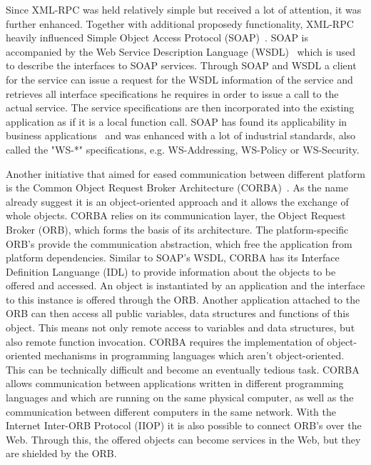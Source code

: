 Since \textrm{XML-RPC} was held relatively simple but received a lot of attention, it was further enhanced.
Together with additional proposedy functionality, XML-RPC heavily influenced Simple Object Access Protocol (\textrm{SOAP})~\cite{box2000simple}.
\textrm{SOAP} is accompanied by the Web Service Description Language (\textrm{WSDL})~\cite{christensen2001web} which is used to describe the interfaces to SOAP services.
Through \textrm{SOAP} and \textrm{WSDL} a client for the service can issue a request for the \textrm{WSDL} information of the service and retrieves all interface specifications he requires in order to issue a call to the actual service.
The service specifications are then incorporated into the existing application as if it is a local function call.
\textrm{SOAP} has found its applicability in business applications~\cite{journals/itpro/BarrosD06} and was enhanced with a lot of industrial standards, also called the "WS-*" specifications, e.g. WS-Addressing, WS-Policy or WS-Security.

Another initiative that aimed for eased communication between different platform is the Common Object Request Broker Architecture (\textrm{CORBA})~\cite{dec1991common}.
As the name already suggest it is an object-oriented approach and it allows the exchange of whole objects.
\textrm{CORBA} relies on its communication layer, the Object Request Broker (\textrm{ORB}), which forms the basis of its architecture.
The platform-specific \textrm{ORB}'s provide the communication abstraction, which free the application from platform dependencies.
Similar to \textrm{SOAP}'s \textrm{WSDL}, \textrm{CORBA} has its Interface Definition Languange (\textrm{IDL}) to provide information about the objects to be offered and accessed.
An object is instantiated by an application and the interface to this instance is offered through the \textrm{ORB}.
Another application attached to the \textrm{ORB} can then access all public variables, data structures and functions of this object.
This means not only remote access to variables and data structures, but also remote function invocation.
\textrm{CORBA} requires the implementation of object-oriented mechanisms in programming languages which aren't object-oriented.
This can be technically difficult and become an eventually tedious task.
\textrm{CORBA} allows communication between applications written in different programming languages and which are running on the same physical computer, as well as the communication between different computers in the same network.
With the Internet Inter-\textrm{ORB} Protocol (\textrm{IIOP}) it is also possible to connect \textrm{ORB}'s over the Web.
Through this, the offered objects can become services in the Web, but they are shielded by the \textrm{ORB}.

